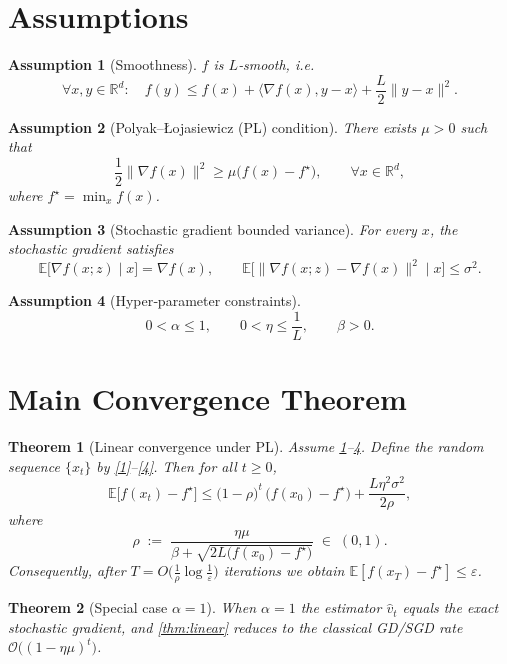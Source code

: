 \documentclass{article}
\newtheorem{theorem}{Theorem}
\newtheorem{assumption}{Assumption}
\newcommand{\E}{\mathbb{E}}
\newcommand{\R}{\mathbb{R}}
\begin{document}
\section*{Assumptions}
\begin{assumption}[Smoothness]\label{ass:smooth}
$f$ is $L$‑smooth, i.e.
\[
\forall x,y\in\R^{d}:\quad
f(y)\le f(x)+\langle\nabla f(x),y-x\rangle+\frac{L}{2}\|y-x\|^{2}.
\]
\end{assumption}
\begin{assumption}[Polyak–Łojasiewicz (PL) condition]\label{ass:pl}
There exists $\mu>0$ such that
\[
\frac12\|\nabla f(x)\|^{2}\ge \mu\bigl(f(x)-f^{\star}\bigr),
\qquad\forall x\in\R^{d},
\]
where $f^{\star}= \min_{x}f(x)$.
\end{assumption}
\begin{assumption}[Stochastic gradient bounded variance]\label{ass:var}
For every $x$, the stochastic gradient satisfies
\[
\E\!\bigl[\nabla f(x;z)\mid x\bigr]=\nabla f(x),\qquad
\E\!\bigl[\|\nabla f(x;z)-\nabla f(x)\|^{2}\mid x\bigr]\le\sigma^{2}.
\]
\end{assumption}
\begin{assumption}[Hyper‑parameter constraints]\label{ass:params}
\[
0<\alpha\le 1,\qquad 0<\eta\le\frac{1}{L},\qquad \beta>0.
\]
\end{assumption}

\section*{Main Convergence Theorem}
\begin{theorem}[Linear convergence under PL]\label{thm:linear}
Assume \ref{ass:smooth}–\ref{ass:params}.  
Define the random sequence $\{x_{t}\}$ by \eqref{1}–\eqref{4}.
Then for all $t\ge 0$,
\[
\E\bigl[f(x_{t})-f^{\star}\bigr]\le
\bigl(1-\rho\bigr)^{t}\,\bigl(f(x_{0})-f^{\star}\bigr)
+\frac{L\eta^{2}\sigma^{2}}{2\rho},
\]
where
\[
\rho\;:=\;\frac{\eta\mu}{\beta+\sqrt{2L\bigl(f(x_{0})-f^{\star}\bigr)}}
\;\in\;(0,1).
\]
Consequently, after $T=O\!\bigl(\frac{1}{\rho}\log\frac{1}{\varepsilon}\bigr)$
iterations we obtain $\E[f(x_{T})-f^{\star}]\le\varepsilon$.
\end{theorem}

\begin{theorem}[Special case $\alpha=1$]\label{thm:gd}
When $\alpha=1$ the estimator $\hat v_{t}$ equals the exact stochastic
gradient, and \eqref{thm:linear} reduces to the classical
GD/SGD rate $\mathcal O\bigl((1-\eta\mu)^{t}\bigr)$.
\end{theorem}
\end{document}
